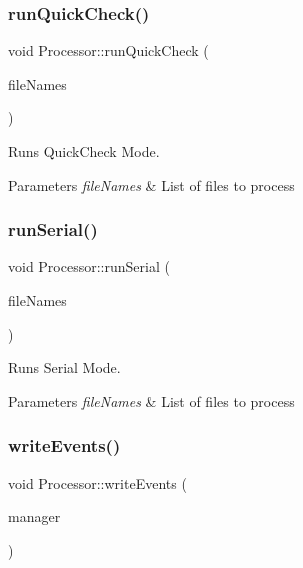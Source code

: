 \subsubsection{\texorpdfstring{run\+Quick\+Check()}{runQuickCheck()}}
{\footnotesize\ttfamily void Processor\+::run\+Quick\+Check (\begin{DoxyParamCaption}\item[{const std\+::vector$<$ std\+::string $>$ \&}]{file\+Names }\end{DoxyParamCaption})\hspace{0.3cm}{\ttfamily [private]}}



Runs Quick\+Check Mode. 


\begin{DoxyParams}{Parameters}
{\em file\+Names} & List of files to process \\
\hline
\end{DoxyParams}
\mbox{\label{class_processor_a7475d40a755f8afa7b6746c7949454d9}} 
\subsubsection{\texorpdfstring{run\+Serial()}{runSerial()}}
{\footnotesize\ttfamily void Processor\+::run\+Serial (\begin{DoxyParamCaption}\item[{const std\+::vector$<$ std\+::string $>$ \&}]{file\+Names }\end{DoxyParamCaption})\hspace{0.3cm}{\ttfamily [private]}}



Runs Serial Mode. 


\begin{DoxyParams}{Parameters}
{\em file\+Names} & List of files to process \\
\hline
\end{DoxyParams}
\mbox{\label{class_processor_a1a19cb73f339992d6dd1be580c8efef0}} 
\subsubsection{\texorpdfstring{write\+Events()}{writeEvents()}}
{\footnotesize\ttfamily void Processor\+::write\+Events (\begin{DoxyParamCaption}\item[{std\+::unique\+\_\+ptr$<$ \hyperlink{class_event_tree_manager}{Event\+Tree\+Manager} $>$ \&}]{manager }\end{DoxyParamCaption})\hspace{0.3cm}{\ttfamily [private]}}



